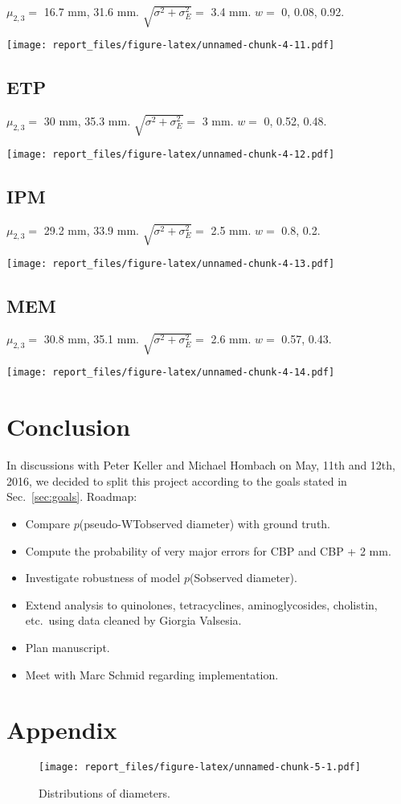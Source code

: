 \documentclass[]{article}
\begin{document}
\(\mu_{2,3}=\) 16.7 mm, 31.6 mm. \(\sqrt{\sigma^2+\sigma_E^2}=\) 3.4 mm.
\(w=\) 0, 0.08, 0.92.

\texttt{[image: report\_files/figure-latex/unnamed-chunk-4-11.pdf]}

\pagebreak

\subsection{ETP}\label{etp}

\(\mu_{2,3}=\) 30 mm, 35.3 mm. \(\sqrt{\sigma^2+\sigma_E^2}=\) 3 mm.
\(w=\) 0, 0.52, 0.48.

\texttt{[image: report\_files/figure-latex/unnamed-chunk-4-12.pdf]}

\pagebreak

\subsection{IPM}\label{ipm}

\(\mu_{2,3}=\) 29.2 mm, 33.9 mm. \(\sqrt{\sigma^2+\sigma_E^2}=\) 2.5 mm.
\(w=\) 0.8, 0.2.

\texttt{[image: report\_files/figure-latex/unnamed-chunk-4-13.pdf]}

\pagebreak

\subsection{MEM}\label{mem}

\(\mu_{2,3}=\) 30.8 mm, 35.1 mm. \(\sqrt{\sigma^2+\sigma_E^2}=\) 2.6 mm.
\(w=\) 0.57, 0.43.

\texttt{[image: report\_files/figure-latex/unnamed-chunk-4-14.pdf]}

\section{Conclusion}\label{conclusion}

In discussions with Peter Keller and Michael Hombach on May, 11th and
12th, 2016, we decided to split this project according to the goals
stated in Sec.~\ref{sec:goals}. Roadmap:

\begin{itemize}
\itemsep1pt\parskip0pt
\item
  Compare \(p\)(pseudo-WT\textbar{}observed diameter) with ground truth.
\item
  Compute the probability of very major errors for CBP and CBP + 2 mm.
\item
  Investigate robustness of model \(p\)(S\textbar{}observed diameter).
\item
  Extend analysis to quinolones, tetracyclines, aminoglycosides,
  cholistin, etc.~using data cleaned by Giorgia Valsesia.
\item
  Plan manuscript.
\item
  Meet with Marc Schmid regarding implementation.
\end{itemize}

\section{Appendix}\label{appendix}

\begin{figure}[htbp]
\centering
\texttt{[image: report\_files/figure-latex/unnamed-chunk-5-1.pdf]}
\caption{\label{fig:allDistr}Distributions of diameters.}
\end{figure}
\end{document}
